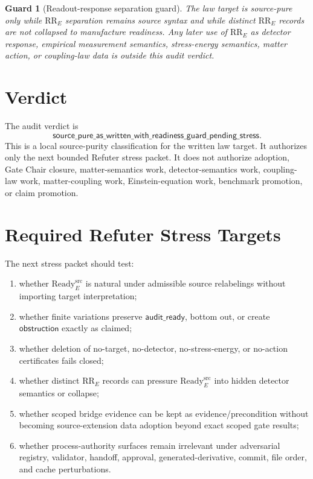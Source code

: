 \documentclass[11pt]{article}
\newcommand{\Ready}{\mathrm{Ready}^{\mathrm{src}}_E}
\newcommand{\AuditReady}{\mathsf{audit\_ready}}
\newcommand{\Obstruction}{\mathsf{obstruction}}
\newcommand{\AuditVerdict}{\mathsf{source\_pure\_as\_written\_with\_readiness\_guard\_pending\_stress}}
\newtheorem{guard}{Guard}
\begin{document}
\begin{guard}[Readout-response separation guard]
The law target is source-pure only while \(\mathrm{RR}_E\) separation remains
source syntax and while distinct \(\mathrm{RR}_E\) records are not collapsed to
manufacture readiness. Any later use of \(\mathrm{RR}_E\) as detector
response, empirical measurement semantics, stress-energy semantics, matter
action, or coupling-law data is outside this audit verdict.
\end{guard}

\section{Verdict}

The audit verdict is
\[
  \AuditVerdict.
\]
This is a local source-purity classification for the written law target. It
authorizes only the next bounded Refuter stress packet. It does not authorize
adoption, Gate Chair closure, matter-semantics work, detector-semantics work,
coupling-law work, matter-coupling work, Einstein-equation work, benchmark
promotion, or claim promotion.

\section{Required Refuter Stress Targets}

The next stress packet should test:
\begin{enumerate}[leftmargin=*]
  \item whether \(\Ready\) is natural under admissible source relabelings
  without importing target interpretation;
  \item whether finite variations preserve \(\AuditReady\), bottom out, or
  create \(\Obstruction\) exactly as claimed;
  \item whether deletion of no-target, no-detector, no-stress-energy, or
  no-action certificates fails closed;
  \item whether distinct \(\mathrm{RR}_E\) records can pressure
  \(\Ready\) into hidden detector semantics or collapse;
  \item whether scoped bridge evidence can be kept as evidence/precondition
  without becoming source-extension data adoption beyond exact scoped gate
  results;
  \item whether process-authority surfaces remain irrelevant under adversarial
  registry, validator, handoff, approval, generated-derivative, commit, file
  order, and cache perturbations.
\end{enumerate}
\end{document}
